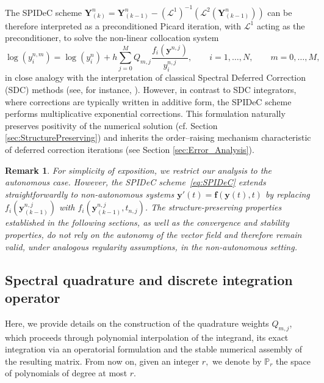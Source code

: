 \documentclass[a4paper,num-refs]{oup-contemporary-spidec}
\newtheorem{remark}[theorem]{Remark}
\begin{document}
The SPIDeC scheme $\bm Y_{(k)}^n =\bm Y^n_{(k-1)}-(\bm{\mathcal L}^1)^{-1}(\bm{\mathcal L}^2(\bm Y^n_{(k-1)}))$ can be therefore interpreted as a
preconditioned Picard iteration, with $\bm{\mathcal L}^1$ acting as the preconditioner, to solve the non-linear
collocation system 
\begin{equation}\label{eq:coll_syst_SenzaL}
    \log(y_i^{n,m}) =\log(y_i^{n})+h\sum_{j=0}^{M} Q_{m,j} \dfrac{f_i(\bm y^{n,j})}{y_i^{n,j}}, \qquad i=1,\dots,N, \qquad m=0,\dots,M,
\end{equation}
in close analogy with the interpretation of classical
Spectral Deferred Correction (SDC) methods (see, for instance, \cite{Dutt_2000,Ong_2020,Speck_2018}). However, in contrast to SDC integrators, where corrections are typically written in additive form, the SPIDeC scheme performs multiplicative exponential corrections. This formulation naturally preserves positivity of the numerical solution (cf. Section \ref{sec:StructurePreserving}) and inherits the order–raising mechanism characteristic of deferred correction iterations (see Section \ref{sec:Error_Analysis}). 

\begin{remark}
    For simplicity of exposition, we restrict our analysis to the autonomous case. However, the SPIDeC scheme~\eqref{eq:SPIDeC} extends straightforwardly to non-autonomous systems 
    $\bm{y}'(t)=\bm{f}(\bm{y}(t),t)$ by replacing 
    $f_i(\bm{y}^{n,j}_{(k-1)})$ with $f_i(\bm{y}^{n,j}_{(k-1)},t_{n,j})$. 
    The structure-preserving properties established in the following sections, as well as the convergence and stability properties, do not rely on the autonomy of the vector field and therefore remain valid, under analogous regularity assumptions, in the non-autonomous setting.
\end{remark}

\subsection{Spectral quadrature and discrete integration operator}\label{subsec:Quadrature} 
Here, we provide details on the construction of the quadrature  weights $Q_{m,j}$, which proceeds through polynomial interpolation  of the integrand, its exact integration via an operatorial  formulation and the stable numerical assembly of the resulting  matrix. From now on, given an integer $r,$ we denote by $\mathbb{P}_r$ the space of polynomials of degree at most $r.$
\end{document}
